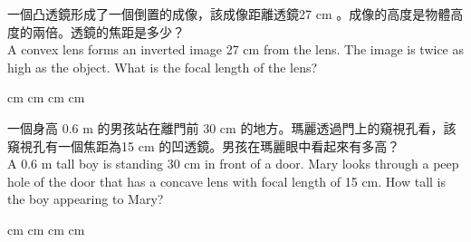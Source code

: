 \documentclass[beamer=true]{standalone}
\begin{document}
\begin{eg}
    一個凸透鏡形成了一個倒置的成像，該成像距離透鏡27 cm 。成像的高度是物體高度的兩倍。透鏡的焦距是多少？\\A convex lens forms an inverted image 27 cm from the lens. The image is twice as high as the object. What is the focal length of the lens?
    \begin{tasks}
         cm
         cm
         cm
         cm
    \end{tasks}
\end{eg}

\begin{eg}
    一個身高 0.6 m 的男孩站在離門前 30 cm 的地方。瑪麗透過門上的窺視孔看，該窺視孔有一個焦距為15 cm 的凹透鏡。男孩在瑪麗眼中看起來有多高？\\
    A 0.6 m tall boy is standing 30 cm in front of a door. Mary looks through a peep hole of the door that has a concave lens with focal length of 15 cm. How tall is the boy appearing to Mary?
    \begin{tasks}
         cm
         cm
         cm
         cm
    \end{tasks}
\end{eg}
\end{document}
